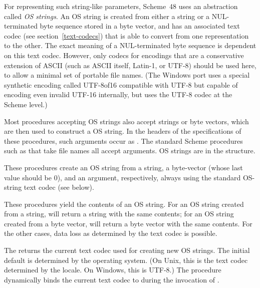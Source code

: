 For representing such string-like parameters, Scheme~48 uses an
abstraction called \textit{OS strings}.  An OS string is created from
either a string or a NUL-terminated byte sequence stored in a byte
vector, and has an associated text codec (see
section~\ref{text-codecs}) that is able to convert from one
representation to the other.  The exact meaning of a NUL-terminated
byte sequence is dependent on this text codec.  However, only codecs
for encodings that are a conservative extension of ASCII (such as
ASCII itself, Latin-1, or UTF-8) should be used here, to allow a
minimal set of portable file names.  (The Windows port uses a special
synthetic encoding called UTF-8of16 compatible with UTF-8 but capable
of encoding even invalid UTF-16 internally, but uses the UTF-8 codec
at the Scheme level.)

Most procedures accepting OS strings also accept strings or byte
vectors, which are then used to construct a OS string.  In the headers
of the specifications of these procedures, such arguments occur as
.
The standard Scheme procedures such as  that
take file names all accept  arguments.  OS
strings are in the  structure.

\begin{protos}
\end{protos}
\noindent
These procedures create an OS string from a string, a byte-vector
(whose last value should be 0), and an  argument,
respectively, always using the standard OS-string text codec (see
below).

\begin{protos}
\end{protos}
\noindent
These procedures yield the contents of an OS string.  For an OS string
created from a string,  will return a string
with the same contents; for an OS string created from a byte vector,
 will return a byte vector with the same
contents.  For the other cases, data loss as determined by the text
codec is possible.

\begin{protos}
\end{protos}
\noindent
The  returns the current text codec
used for creating new OS strings.  The initial default is determined
by the operating system.  (On Unix, this is the text codec determined
by the locale.  On Windows, this is UTF-8.)  The
 procedure dynamically binds the
current text codec to  during the invocation of
.

